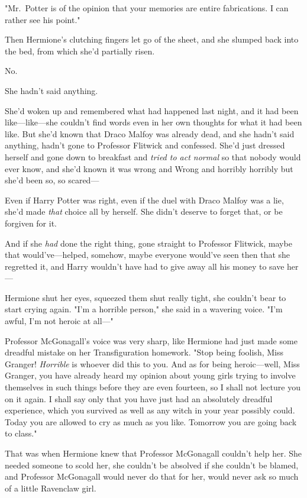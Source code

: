 "Mr.~Potter is of the opinion that your memories are entire fabrications. I can
rather see his point."

Then Hermione's clutching fingers let go of the sheet, and she slumped back
into the bed, from which she'd partially risen.

No.

She hadn't said anything.

She'd woken up and remembered what had happened last night, and it had been
like---like---she couldn't find words even in her own thoughts for what it had
been like. But she'd known that Draco Malfoy was already dead, and she hadn't
said anything, hadn't gone to Professor Flitwick and confessed. She'd just
dressed herself and gone down to breakfast and \emph{tried to act normal} so
that nobody would ever know, and she'd known it was wrong and Wrong and
horribly horribly  but she'd been so, so scared---

Even if Harry Potter was right, even if the duel with Draco Malfoy was a lie,
she'd made \emph{that} choice all by herself. She didn't deserve to forget
that, or be forgiven for it.

And if she \emph{had} done the right thing, gone straight to Professor
Flitwick, maybe that would've---helped, somehow, maybe everyone would've seen
then that she regretted it, and Harry wouldn't have had to give away all his
money to save her---

Hermione shut her eyes, squeezed them shut really tight, she couldn't bear to
start crying again. "I'm a horrible person," she said in a wavering voice. "I'm
awful, I'm not heroic at all\mbox{---}"

Professor McGonagall's voice was very sharp, like Hermione had just made some
dreadful mistake on her Transfiguration homework. "Stop being foolish, Miss
Granger! \emph{Horrible} is whoever did this to you. And as for being
heroic---well, Miss Granger, you have already heard my opinion about young
girls trying to involve themselves in such things before they are even
fourteen, so I shall not lecture you on it again. I shall say only that you
have just had an absolutely dreadful experience, which you survived as well as
any witch in your year possibly could. Today you are allowed to cry as much as
you like. Tomorrow you are going back to class."

That was when Hermione knew that Professor McGonagall couldn't help her. She
needed someone to scold her, she couldn't be absolved if she couldn't be
blamed, and Professor McGonagall would never do that for her, would never ask
so much of a little Ravenclaw girl.

